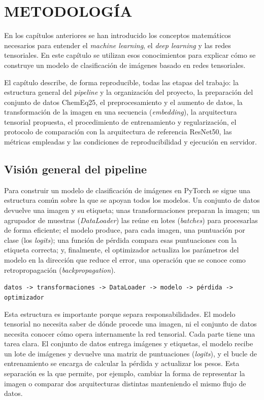 \chapter{METODOLOGÍA}

En los capítulos anteriores se han introducido los conceptos matemáticos necesarios para entender el \textit{machine learning}, el \textit{deep learning} y las redes tensoriales. En este capítulo se utilizan esos conocimientos para explicar cómo se construye un modelo de clasificación de imágenes basado en redes tensoriales.

El capítulo describe, de forma reproducible, todas las etapas del trabajo: la estructura general del \textit{pipeline} y la organización del proyecto, la preparación del conjunto de datos ChemEq25, el preprocesamiento y el aumento de datos, la transformación de la imagen en una secuencia (\textit{embedding}), la arquitectura tensorial propuesta, el procedimiento de entrenamiento y regularización, el protocolo de comparación con la arquitectura de referencia ResNet50, las métricas empleadas y las condiciones de reproducibilidad y ejecución en servidor.

\section{Visión general del pipeline}\label{sec:pipeline}

Para construir un modelo de clasificación de imágenes en PyTorch se sigue una estructura común sobre la que se apoyan todos los modelos. Un conjunto de datos devuelve una imagen y su etiqueta; unas transformaciones preparan la imagen; un agrupador de muestras (\textit{DataLoader}) las reúne en lotes (\textit{batches}) para procesarlas de forma eficiente; el modelo produce, para cada imagen, una puntuación por clase (los \textit{logits}); una función de pérdida compara esas puntuaciones con la etiqueta correcta; y, finalmente, el optimizador actualiza los parámetros del modelo en la dirección que reduce el error, una operación que se conoce como retropropagación (\textit{backpropagation}).

\begin{center}
\texttt{datos -> transformaciones -> DataLoader -> modelo -> pérdida -> optimizador}
\end{center}

Esta estructura es importante porque separa responsabilidades. El modelo tensorial no necesita saber de dónde procede una imagen, ni el conjunto de datos necesita conocer cómo opera internamente la red tensorial. Cada parte tiene una tarea clara. El conjunto de datos entrega imágenes y etiquetas, el modelo recibe un lote de imágenes y devuelve una matriz de puntuaciones (\textit{logits}), y el bucle de entrenamiento se encarga de calcular la pérdida y actualizar los pesos. Esta separación es la que permite, por ejemplo, cambiar la forma de representar la imagen o comparar dos arquitecturas distintas manteniendo el mismo flujo de datos.

